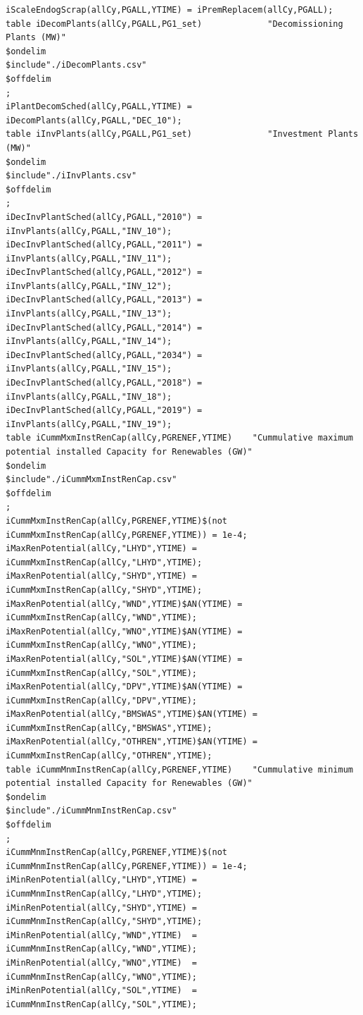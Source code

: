 \documentclass[a4paper,]{scrartcl}
\begin{document}
\begin{lstlisting}
iScaleEndogScrap(allCy,PGALL,YTIME) = iPremReplacem(allCy,PGALL);
table iDecomPlants(allCy,PGALL,PG1_set)             "Decomissioning Plants (MW)"
$ondelim
$include"./iDecomPlants.csv"
$offdelim
;
iPlantDecomSched(allCy,PGALL,YTIME) = iDecomPlants(allCy,PGALL,"DEC_10");
table iInvPlants(allCy,PGALL,PG1_set)               "Investment Plants (MW)"
$ondelim
$include"./iInvPlants.csv"
$offdelim
;
iDecInvPlantSched(allCy,PGALL,"2010") = iInvPlants(allCy,PGALL,"INV_10");
iDecInvPlantSched(allCy,PGALL,"2011") = iInvPlants(allCy,PGALL,"INV_11");
iDecInvPlantSched(allCy,PGALL,"2012") = iInvPlants(allCy,PGALL,"INV_12");
iDecInvPlantSched(allCy,PGALL,"2013") = iInvPlants(allCy,PGALL,"INV_13");
iDecInvPlantSched(allCy,PGALL,"2014") = iInvPlants(allCy,PGALL,"INV_14");
iDecInvPlantSched(allCy,PGALL,"2034") = iInvPlants(allCy,PGALL,"INV_15");
iDecInvPlantSched(allCy,PGALL,"2018") = iInvPlants(allCy,PGALL,"INV_18");
iDecInvPlantSched(allCy,PGALL,"2019") = iInvPlants(allCy,PGALL,"INV_19");
table iCummMxmInstRenCap(allCy,PGRENEF,YTIME)    "Cummulative maximum potential installed Capacity for Renewables (GW)"
$ondelim
$include"./iCummMxmInstRenCap.csv"
$offdelim
;
iCummMxmInstRenCap(allCy,PGRENEF,YTIME)$(not iCummMxmInstRenCap(allCy,PGRENEF,YTIME)) = 1e-4;
iMaxRenPotential(allCy,"LHYD",YTIME) = iCummMxmInstRenCap(allCy,"LHYD",YTIME);
iMaxRenPotential(allCy,"SHYD",YTIME) = iCummMxmInstRenCap(allCy,"SHYD",YTIME);
iMaxRenPotential(allCy,"WND",YTIME)$AN(YTIME) = iCummMxmInstRenCap(allCy,"WND",YTIME);
iMaxRenPotential(allCy,"WNO",YTIME)$AN(YTIME) = iCummMxmInstRenCap(allCy,"WNO",YTIME);
iMaxRenPotential(allCy,"SOL",YTIME)$AN(YTIME) = iCummMxmInstRenCap(allCy,"SOL",YTIME);
iMaxRenPotential(allCy,"DPV",YTIME)$AN(YTIME) = iCummMxmInstRenCap(allCy,"DPV",YTIME);
iMaxRenPotential(allCy,"BMSWAS",YTIME)$AN(YTIME) = iCummMxmInstRenCap(allCy,"BMSWAS",YTIME);
iMaxRenPotential(allCy,"OTHREN",YTIME)$AN(YTIME) = iCummMxmInstRenCap(allCy,"OTHREN",YTIME);
table iCummMnmInstRenCap(allCy,PGRENEF,YTIME)    "Cummulative minimum potential installed Capacity for Renewables (GW)"
$ondelim
$include"./iCummMnmInstRenCap.csv"
$offdelim
;
iCummMnmInstRenCap(allCy,PGRENEF,YTIME)$(not iCummMnmInstRenCap(allCy,PGRENEF,YTIME)) = 1e-4;
iMinRenPotential(allCy,"LHYD",YTIME) = iCummMnmInstRenCap(allCy,"LHYD",YTIME);
iMinRenPotential(allCy,"SHYD",YTIME) = iCummMnmInstRenCap(allCy,"SHYD",YTIME);
iMinRenPotential(allCy,"WND",YTIME)  = iCummMnmInstRenCap(allCy,"WND",YTIME);
iMinRenPotential(allCy,"WNO",YTIME)  = iCummMnmInstRenCap(allCy,"WNO",YTIME);
iMinRenPotential(allCy,"SOL",YTIME)  = iCummMnmInstRenCap(allCy,"SOL",YTIME);

\end{lstlisting}
\end{document}
